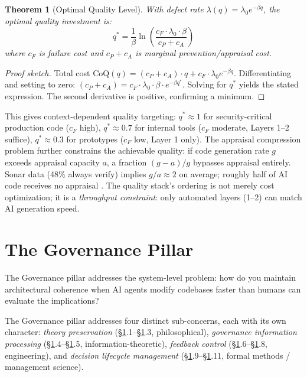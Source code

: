 \documentclass[11pt, a4paper, logo, copyright]{googledeepmind}
\newtheorem{theorem}{Theorem}[section]
\begin{document}
\begin{theorem}[Optimal Quality Level]
\label{thm:optquality}
With defect rate $\lambda(q) = \lambda_0 e^{-\beta q}$, the optimal quality investment is:
\begin{equation}
q^* = \frac{1}{\beta} \ln\!\left(\frac{c_F \cdot \lambda_0 \cdot \beta}{c_P + c_A}\right)
\end{equation}
where $c_F$ is failure cost and $c_P + c_A$ is marginal prevention/appraisal cost.
\end{theorem}

\begin{proof}[Proof sketch]
Total cost $\text{CoQ}(q) = (c_P + c_A) \cdot q + c_F \cdot \lambda_0 e^{-\beta q}$. Differentiating and setting to zero: $(c_P + c_A) = c_F \cdot \lambda_0 \cdot \beta \cdot e^{-\beta q^*}$. Solving for $q^*$ yields the stated expression. The second derivative is positive, confirming a minimum.
\end{proof}

This gives context-dependent quality targeting: $q^* \approx 1$ for security-critical production code ($c_F$ high), $q^* \approx 0.7$ for internal tools ($c_F$ moderate, Layers 1--2 suffice), $q^* \approx 0.3$ for prototypes ($c_F$ low, Layer 1 only). The appraisal compression problem further constrains the achievable quality: if code generation rate $g$ exceeds appraisal capacity $a$, a fraction $(g-a)/g$ bypasses appraisal entirely. Sonar data (48\% always verify) implies $g/a \approx 2$ on average; roughly half of AI code receives no appraisal \citep{sonar2026}. The quality stack's ordering is not merely cost optimization; it is a \emph{throughput constraint}: only automated layers (1--2) can match AI generation speed.


\section{The Governance Pillar}
\label{sec:governance}

The Governance pillar addresses the system-level problem: how do you maintain architectural coherence when AI agents modify codebases faster than humans can evaluate the implications?

\noindent The Governance pillar addresses four distinct sub-concerns, each with its own character: \emph{theory preservation} (\S\ref{sec:governance}.1--\S\ref{sec:governance}.3, philosophical), \emph{governance information processing} (\S\ref{sec:governance}.4--\S\ref{sec:governance}.5, information-theoretic), \emph{feedback control} (\S\ref{sec:governance}.6--\S\ref{sec:governance}.8, engineering), and \emph{decision lifecycle management} (\S\ref{sec:governance}.9--\S\ref{sec:governance}.11, formal methods / management science).
\end{document}
